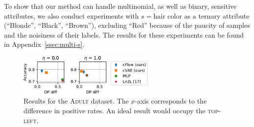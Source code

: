 To show that our method can handle multinomial, as well as binary, sensitive attributes, we also conduct experiments with $s=\textrm{hair color}$ as a ternary attribute (``Blonde'', ``Black'', ``Brown''), excluding ``Red'' because of the paucity of samples and the noisiness of their labels. The results for these experiments can be found in Appendix~\ref{ssec:multi-s}.

\begin{figure}[tb]
  \centering
  \includegraphics[width=0.6\textwidth]{./Figures/nosinn_adult_multiplot_mini_diff.pdf}
  \caption{
      Results for the \textsc{Adult} dataset.
      The $x$-axis corresponds to the difference in positive rates.
      An ideal result would occupy the \textsc{top-left}.
  }%
  \label{fig:adult-chart}
\end{figure}

